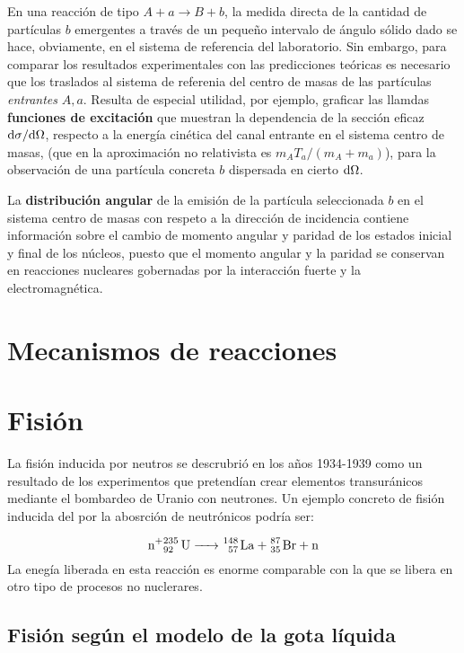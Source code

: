 En una reacción de tipo $A+a\longrightarrow B+b$, la medida directa de la cantidad de partículas $b$ emergentes a través de un pequeño intervalo de ángulo sólido dado se hace, obviamente, en el sistema de referencia del laboratorio. Sin  embargo, para comparar los resultados experimentales con las predicciones teóricas es necesario que los traslados al sistema de referenia del centro de masas de las partículas \textit{entrantes} $A,a$. Resulta de especial utilidad, por ejemplo, graficar las llamdas \textbf{funciones de excitación} que muestran la dependencia de la sección eficaz $\mathrm{d} \sigma / \mathrm{d} \Omega$, respecto a la energía cinética del canal entrante en el sistema centro de masas, (que en la aproximación no relativista es $m_A T_a / (m_A + m_a)$), para la observación de una partícula concreta $b$ dispersada en cierto $\mathrm{d} \Omega$. 

La \textbf{distribución angular} de la emisión de la partícula seleccionada $b$ en el sistema centro de masas con respeto a la dirección de incidencia contiene información sobre el cambio de momento angular y paridad de los estados inicial y final de los núcleos, puesto que el momento angular y la paridad se conservan en reacciones nucleares gobernadas por la interacción fuerte y la electromagnética.



\section{Mecanismos de reacciones}

\section{Fisión}

La fisión inducida por neutros se descrubrió en los años 1934-1939 como un resultado de los experimentos que pretendían crear elementos transuránicos mediante el bombardeo de Uranio con neutrones. Un ejemplo concreto de fisión inducida del  por la abosrción de neutrónicos podría ser:

\begin{equation}
\ce{n+^235_92 U -> ^148_57 La + ^87_35 Br + n}
\end{equation}
La enegía liberada en esta reacción es enorme comparable con la que se libera en otro tipo de procesos no nuclerares. 

\subsection{Fisión según el modelo de la gota líquida}

